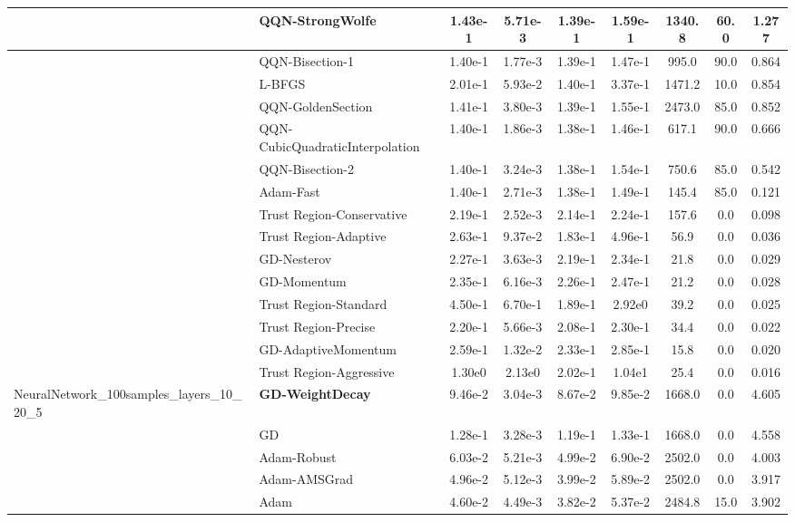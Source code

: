 \documentclass[10pt]{article}
\begin{document}
\begin{longtable}{|l|l|c|c|c|c|c|c|c|}
\hline
 & QQN-StrongWolfe & 1.43e-1 & 5.71e-3 & 1.39e-1 & 1.59e-1 & 1340.8 & 60.0 & 1.277 \\
\hline
 & QQN-Bisection-1 & 1.40e-1 & 1.77e-3 & 1.39e-1 & 1.47e-1 & 995.0 & 90.0 & 0.864 \\
\hline
 & L-BFGS & 2.01e-1 & 5.93e-2 & 1.40e-1 & 3.37e-1 & 1471.2 & 10.0 & 0.854 \\
\hline
 & QQN-GoldenSection & 1.41e-1 & 3.80e-3 & 1.39e-1 & 1.55e-1 & 2473.0 & 85.0 & 0.852 \\
\hline
 & QQN-CubicQuadraticInterpolation & 1.40e-1 & 1.86e-3 & 1.38e-1 & 1.46e-1 & 617.1 & 90.0 & 0.666 \\
\hline
 & QQN-Bisection-2 & 1.40e-1 & 3.24e-3 & 1.38e-1 & 1.54e-1 & 750.6 & 85.0 & 0.542 \\
\hline
 & Adam-Fast & 1.40e-1 & 2.71e-3 & 1.38e-1 & 1.49e-1 & 145.4 & 85.0 & 0.121 \\
\hline
 & Trust Region-Conservative & 2.19e-1 & 2.52e-3 & 2.14e-1 & 2.24e-1 & 157.6 & 0.0 & 0.098 \\
\hline
 & Trust Region-Adaptive & 2.63e-1 & 9.37e-2 & 1.83e-1 & 4.96e-1 & 56.9 & 0.0 & 0.036 \\
\hline
 & GD-Nesterov & 2.27e-1 & 3.63e-3 & 2.19e-1 & 2.34e-1 & 21.8 & 0.0 & 0.029 \\
\hline
 & GD-Momentum & 2.35e-1 & 6.16e-3 & 2.26e-1 & 2.47e-1 & 21.2 & 0.0 & 0.028 \\
\hline
 & Trust Region-Standard & 4.50e-1 & 6.70e-1 & 1.89e-1 & 2.92e0 & 39.2 & 0.0 & 0.025 \\
\hline
 & Trust Region-Precise & 2.20e-1 & 5.66e-3 & 2.08e-1 & 2.30e-1 & 34.4 & 0.0 & 0.022 \\
\hline
 & GD-AdaptiveMomentum & 2.59e-1 & 1.32e-2 & 2.33e-1 & 2.85e-1 & 15.8 & 0.0 & 0.020 \\
\hline
 & Trust Region-Aggressive & 1.30e0 & 2.13e0 & 2.02e-1 & 1.04e1 & 25.4 & 0.0 & 0.016 \\
NeuralNetwork\_100samples\_layers\_10\_20\_5 & \textbf{GD-WeightDecay} & 9.46e-2 & 3.04e-3 & 8.67e-2 & 9.85e-2 & 1668.0 & 0.0 & 4.605 \\
\hline
 & GD & 1.28e-1 & 3.28e-3 & 1.19e-1 & 1.33e-1 & 1668.0 & 0.0 & 4.558 \\
\hline
 & Adam-Robust & 6.03e-2 & 5.21e-3 & 4.99e-2 & 6.90e-2 & 2502.0 & 0.0 & 4.003 \\
\hline
 & Adam-AMSGrad & 4.96e-2 & 5.12e-3 & 3.99e-2 & 5.89e-2 & 2502.0 & 0.0 & 3.917 \\
\hline
 & Adam & 4.60e-2 & 4.49e-3 & 3.82e-2 & 5.37e-2 & 2484.8 & 15.0 & 3.902 \\

\end{longtable}
\end{document}

